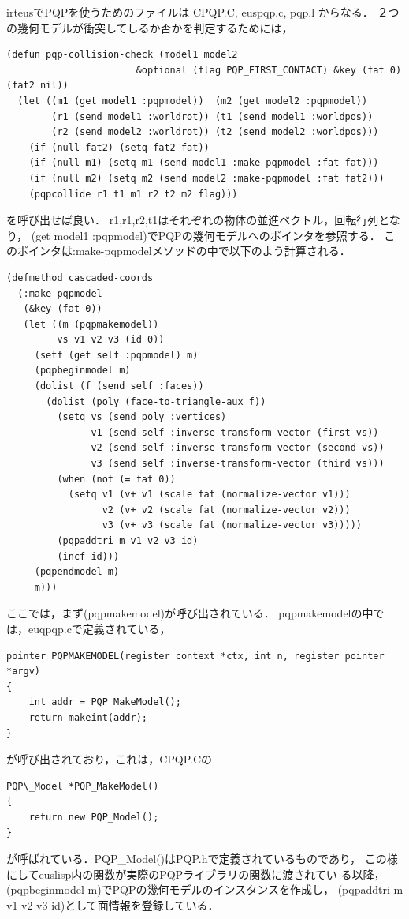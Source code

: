 irteusでPQPを使うためのファイルは
CPQP.C, euspqp.c, pqp.l
からなる．
２つの幾何モデルが衝突してしるか否かを判定するためには，
{\baselineskip=10pt
\begin{verbatim}
(defun pqp-collision-check (model1 model2
				       &optional (flag PQP_FIRST_CONTACT) &key (fat 0) (fat2 nil))
  (let ((m1 (get model1 :pqpmodel))  (m2 (get model2 :pqpmodel))
        (r1 (send model1 :worldrot)) (t1 (send model1 :worldpos))
        (r2 (send model2 :worldrot)) (t2 (send model2 :worldpos)))
    (if (null fat2) (setq fat2 fat))
    (if (null m1) (setq m1 (send model1 :make-pqpmodel :fat fat)))
    (if (null m2) (setq m2 (send model2 :make-pqpmodel :fat fat2)))
    (pqpcollide r1 t1 m1 r2 t2 m2 flag)))
\end{verbatim}
}
を呼び出せば良い．
r1,r1,r2,t1はそれぞれの物体の並進ベクトル，回転行列となり，
(get model1 :pqpmodel)でPQPの幾何モデルへのポインタを参照する．
このポインタは:make-pqpmodelメソッドの中で以下のよう計算される．
{\baselineskip=10pt
\begin{verbatim}
(defmethod cascaded-coords
  (:make-pqpmodel
   (&key (fat 0))
   (let ((m (pqpmakemodel))
         vs v1 v2 v3 (id 0))
     (setf (get self :pqpmodel) m)
     (pqpbeginmodel m)
     (dolist (f (send self :faces))
       (dolist (poly (face-to-triangle-aux f))
         (setq vs (send poly :vertices)
               v1 (send self :inverse-transform-vector (first vs))
               v2 (send self :inverse-transform-vector (second vs))
               v3 (send self :inverse-transform-vector (third vs)))
         (when (not (= fat 0))
           (setq v1 (v+ v1 (scale fat (normalize-vector v1)))
                 v2 (v+ v2 (scale fat (normalize-vector v2)))
                 v3 (v+ v3 (scale fat (normalize-vector v3)))))
         (pqpaddtri m v1 v2 v3 id)
         (incf id)))
     (pqpendmodel m)
     m)))
\end{verbatim}
}
ここでは，まず(pqpmakemodel)が呼び出されている．
pqpmakemodelの中では，euqpqp.cで定義されている，

{\baselineskip=10pt
\begin{verbatim}
pointer PQPMAKEMODEL(register context *ctx, int n, register pointer *argv)
{
    int addr = PQP_MakeModel();
    return makeint(addr);
}
\end{verbatim}
}

が呼び出されており，これは，CPQP.Cの
{\baselineskip=10pt
\begin{verbatim}
PQP\_Model *PQP_MakeModel()
{
    return new PQP_Model();
}
\end{verbatim}
}
が呼ばれている．PQP\_Model()はPQP.hで定義されているものであり，
この様にしてeuslisp内の関数が実際のPQPライブラリの関数に渡されてい
る以降，(pqpbeginmodel m)でPQPの幾何モデルのインスタンスを作成し，
(pqpaddtri m v1 v2 v3 id)として面情報を登録している．

